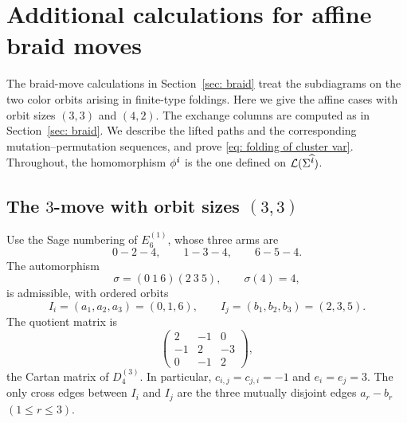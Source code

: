 \documentclass[12pt, leqno]{amsart}
\numberwithin{equation}{section}
\theoremstyle{plain}
\theoremstyle{definition}
\renewcommand{\le}{\leqslant}
\newcommand{\ii}{ \textbf{\textit{i}}}
\newcommand{\hii}{{\widehat{\ii}}}
\newcommand{\calL}{\mathcal{L}}
\begin{document}
\appendix

\section{\texorpdfstring{  Additional calculations for affine braid moves}{Additional calculations for affine braid moves}} \label{app: affine braid folding}

 The braid-move calculations in Section~\ref{sec: braid} treat
the subdiagrams on the two color orbits arising in finite-type
foldings. Here we give the affine cases with orbit sizes
$(3,3)$ and $(4,2)$.{}   The exchange columns are computed as in Section~\ref{sec: braid}.
We describe the lifted paths and the corresponding mutation--permutation
sequences, and prove \eqref{eq: folding of cluster var}.
Throughout, the homomorphism
$\phi^\ii$ is the one defined on  $\calL(\Sigma^\hii)$.

\subsection{\texorpdfstring{  The $3$-move with orbit sizes $(3,3)$}{The 3-move with orbit sizes (3,3)}}
\label{subsec: affine braid 33}

Use the Sage numbering of $E_6^{(1)}$, whose three arms are
\[
 0-2-4,\qquad 1-3-4,\qquad 6-5-4.
\]
The automorphism
\[
 \sigma=(0\ 1\ 6)(2\ 3\ 5),\qquad \sigma(4)=4,
\]
is admissible, with ordered orbits
\[
 I_i=(a_1,a_2,a_3)=(0,1,6),\qquad
 I_j=(b_1,b_2,b_3)=(2,3,5).
\]
The quotient matrix is
\[
 \begin{pmatrix}
 2&-1&0\\ -1&2&-3\\ 0&-1&2
 \end{pmatrix},
\]
the Cartan matrix of $D_4^{(3)}$.  In particular,
$c_{i,j}=c_{j,i}=-1$ and $e_i=e_j=3$.  The only cross edges between
$I_i$ and $I_j$ are the three mutually disjoint edges $a_r-b_r$
$(1\le r\le3)$.
\end{document}
